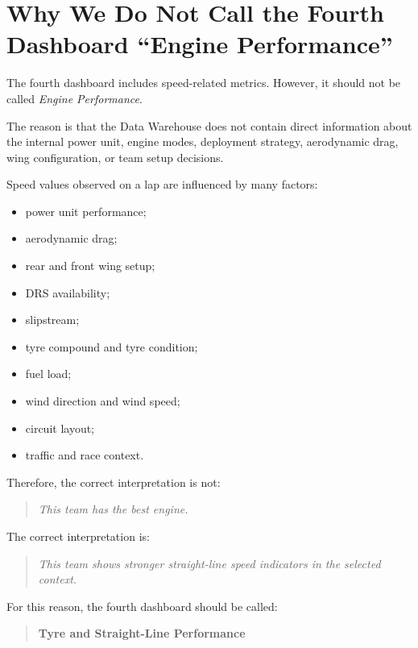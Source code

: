 \documentclass[12pt,a4paper]{article}
\begin{document}
	\section{Why We Do Not Call the Fourth Dashboard ``Engine Performance''}
	
	The fourth dashboard includes speed-related metrics.
	However, it should not be called \textit{Engine Performance}.
	
	The reason is that the Data Warehouse does not contain direct information about the internal power unit, engine modes, deployment strategy, aerodynamic drag, wing configuration, or team setup decisions.
	
	Speed values observed on a lap are influenced by many factors:
	
	\begin{itemize}[leftmargin=1.2cm]
		\item power unit performance;
		\item aerodynamic drag;
		\item rear and front wing setup;
		\item DRS availability;
		\item slipstream;
		\item tyre compound and tyre condition;
		\item fuel load;
		\item wind direction and wind speed;
		\item circuit layout;
		\item traffic and race context.
	\end{itemize}
	
	Therefore, the correct interpretation is not:
	
	\begin{quote}
		\textit{This team has the best engine.}
	\end{quote}
	
	The correct interpretation is:
	
	\begin{quote}
		\textit{This team shows stronger straight-line speed indicators in the selected context.}
	\end{quote}
	
	For this reason, the fourth dashboard should be called:
	
	\begin{quote}
		\textbf{Tyre and Straight-Line Performance}
	\end{quote}
	
\end{document}
